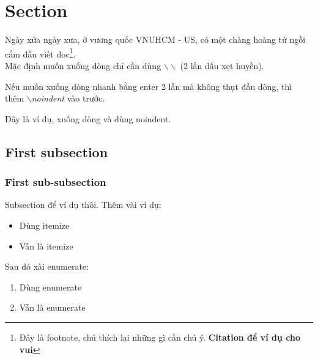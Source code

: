 \documentclass[12pt]{article}
\begin{document}
\begin{titlepage}
\vfill
\end{titlepage}
	
	
\tableofcontents
\pagebreak

\section{Section}
Ngày xửa ngày xưa, ở vương quốc VNUHCM - US, có một chàng hoàng tử ngồi cắm đầu viết doc\cite{greenwade93}\footnote{Đây là footnote, chú thích lại những gì cần chú ý. \textbf{Citation để ví dụ cho vui}}.\\
Mặc định muốn xuống dòng chỉ cần dùng $\backslash\backslash$  (2 lần dấu xẹt huyền). 

Nếu muốn xuống dòng nhanh bằng enter 2 lần mà không thụt đầu dòng, thì thêm \textit{$\backslash$noindent} vào trước.

\noindent Đây là ví dụ, xuống dòng và dùng noindent.

\subsection{First subsection}
\subsubsection{First sub-subsection}
Subsection để ví dụ thôi. Thêm vài ví dụ:
\begin{itemize}
    \item Dùng itemize
    \item Vẫn là itemize
\end{itemize}
Sau đó xài enumerate:
\begin{enumerate}
    \item Dùng enumerate
    \item Vẫn là enumerate
\end{enumerate}
\end{document}
